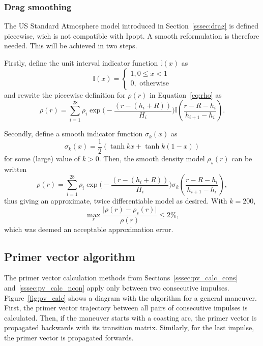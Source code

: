 \subsubsection{Drag smoothing}

The US Standard Atmosphere model introduced in Section~\ref{sssec:drag} is defined piecewise, wich is not compatible with Ipopt. A smooth reformulation is therefore needed. This will be achieved in two steps.

Firstly, define the unit interval indicator function \(\mathbb{I} (x)\) as
\begin{equation}
    \mathbb{I} (x) = \begin{cases}
        1, 0 \leq x < 1 \\
        0, \text{ otherwise}
    \end{cases}
\end{equation}
and rewrite the piecewise definition for \(\rho(r)\) in Equation~\eqref{eq:rho} as
\begin{equation}
    \rho(r) = \sum_{i = 1}^{28} \rho_i \exp{\big(-\frac{\left(r - (h_i + R)\right)}{H_i}\big)} \mathbb{I}(\frac{r - R - h_i}{h_{i+1} - h_i}).
\end{equation}

Secondly, define a smooth indicator function \(\sigma_k(x)\) as
\begin{equation}
    \sigma_k(x) = \frac{1}{2} \left(\tanh{k x} + \tanh{k (1 - x)}\right)
\end{equation}
for some (large) value of \(k > 0\). Then, the smooth density model \(\rho_s(r)\) can be written
\begin{equation}
    \rho(r) = \sum_{i = 1}^{28} \rho_i \exp{\big(-\frac{\left(r - (h_i + R)\right)}{H_i}\big)} \sigma_k(\frac{r - R - h_i}{h_{i+1} - h_i}),
\end{equation}
thus giving an approximate, twice differentiable model as desired. With \(k = 200\), 
\begin{equation}
    \max_r \frac{\lvert \rho(r) - \rho_s(r) \rvert}{\rho(r)} \leq 2\%,
\end{equation}
which was deemed an acceptable approximation error.

\subsection{Primer vector algorithm}

The primer vector calculation methods from Sections~\ref{sssec:pv_calc_cons} and~\ref{sssec:pv_calc_ncon} apply only between two consecutive impulses. Figure~\ref{fig:pv_calc} shows a diagram with the algorithm for a general maneuver. First, the primer vector trajectory between all pairs of consecutive impulses is calculated. Then, if the maneuver starts with a coasting arc, the primer vector is propagated backwards with its transition matrix. Similarly, for the last impulse, the primer vector is propagated forwards. 

